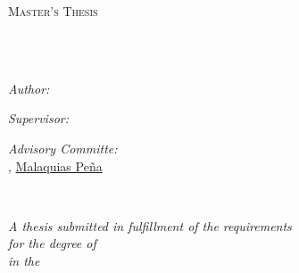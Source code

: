 \documentclass[
11pt, %
greek,english,%
singlespacing, %
headsepline, %
]{MastersDoctoralThesis} %
\author{Panagiotis Mitsopoulos} %
\begin{document}
\frontmatter %

\pagestyle{plain} %


\begin{titlepage}
\begin{center}

\vspace*{.06\textheight}
{\scshape\LARGE \univname\par}\vspace{1.5cm} %
\textsc{\Large Master's Thesis}\\[0.5cm] %

\HRule \\[0.4cm] %
{\huge \bfseries \ttitle\par}\vspace{0.4cm} %
\HRule \\[1.5cm] %
 
\begin{minipage}[t]{0.4\textwidth}
\begin{flushleft} \large
\emph{Author:}\\
\href{https://www.researchgate.net/profile/Panagiotis_Mitsopoulos2}{\authorname} %
\end{flushleft}
\end{minipage}
\begin{minipage}[t]{0.4\textwidth}
\begin{flushright} \large
\emph{Supervisor:} \\
\href{}{\supname} %

\emph{Advisory Committe:}\\
\href{}{\examname},
\href{https://cee.engr.uconn.edu/people/pena-malaquias}{Malaquias Peña}
\end{flushright}
\end{minipage}\\[3cm]
 
\vfill

\large \textit{A thesis submitted in fulfillment of the requirements\\ for the degree of \degreename}\\[0.3cm] %
\textit{in the}\\[0.4cm]
\deptname\\\groupname\\[2cm] %
 

\end{center}
\end{titlepage}
\end{document}
